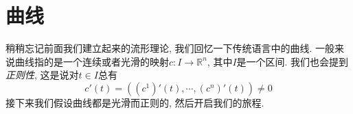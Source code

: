 \chapter{曲线}

稍稍忘记前面我们建立起来的流形理论, 我们回忆一下传统语言中的曲线.
一般来说曲线指的是一个连续或者光滑的映射$c:I\to\mathbb{R}^n$, 其中$I$是一个区间.
我们也会提到\textit{正则性}, 这是说对$t\in I$总有
\[c'(t)=((c^1)'(t),\cdots,(c^n)'(t))\neq 0\]
接下来我们假设曲线都是光滑而正则的, 然后开启我们的旅程.